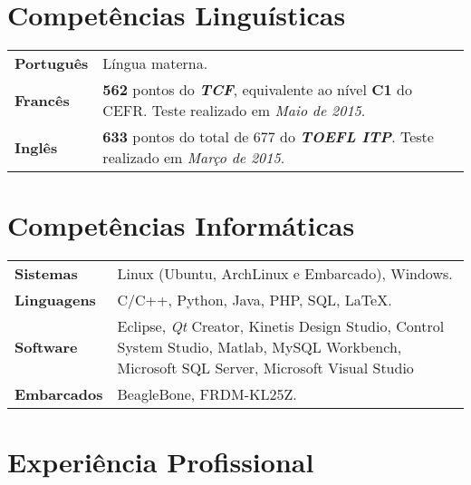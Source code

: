 \documentclass[10pt, a4paper]{article}
\begin{document}



\section{Competências Linguísticas}

\begin{tabular}{p{} p{}}

\textbf{Português} & Língua materna.  \\

\textbf{Francês} & \textbf{562} pontos do \textbf{\textit{TCF}},
equivalente ao nível \textbf{C1} do CEFR. Teste realizado em \textit{Maio
de 2015}.\\

\textbf{Inglês} & \textbf{633} pontos do total de 677 do \textbf{\textit{TOEFL
ITP}}. Teste realizado em \textit{Março de 2015}. \\

\end{tabular}


\section{Competências Informáticas}

\begin{tabular}{p{} p{}}

\textbf{Sistemas} & Linux (Ubuntu, ArchLinux e Embarcado), Windows.  \\

\textbf{Linguagens} & C/C++, Python, Java, PHP,  SQL, \LaTeX.  \\

\textbf{Software} & Eclipse, \textit{Qt} Creator, Kinetis Design Studio,
Control System Studio, Matlab, MySQL Workbench, Microsoft SQL Server, Microsoft
Visual Studio\\

\textbf{Embarcados} & BeagleBone, FRDM-KL25Z. \\

\end{tabular}


\section{Experiência Profissional}
\end{document}
